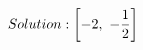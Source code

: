 \documentclass[preview]{standalone}
\begin{document}
\begin{align*}
\special{dvisvgm:raw <g id='unique000'>}Solution: \left[ -2, \  - \frac{1}{2}\right]\special{dvisvgm:raw </g>}
\end{align*}
\end{document}
